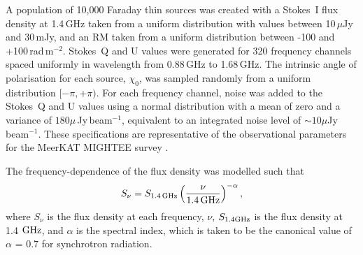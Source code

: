 \documentclass[fleqn,usenatbib]{mnras}
\begin{document}

A population of 10,000 Faraday thin sources was created with a Stokes~I flux density at 1.4\,GHz taken from a uniform distribution with values between 10\,$\mu$Jy and  30\,mJy, and an RM taken from a uniform distribution between -100 and +100\,rad\,m$^{-2}$. Stokes~Q and U values were generated for 320 frequency channels spaced uniformly in wavelength from 0.88\,GHz to 1.68\,GHz. The intrinsic angle of polarisation for each source, $\chi_0$, was sampled randomly from a uniform distribution $[-\pi, +\pi)$.
For each frequency channel, noise was added to the Stokes~Q and U values using a normal distribution with a mean of zero and a variance of $180\mu$\,Jy\,beam$^{-1}$, equivalent to an integrated noise level of $\sim 10\mu$Jy\,beam$^{-1}$. These specifications are representative of the observational parameters for the MeerKAT MIGHTEE survey \citep{Taylor_2017}.


The frequency-dependence of the flux density was modelled such that
%
\begin{equation}
\label{FreqDependent}
S_{\nu} = S_{\rm 1.4\,GHz}\left(\frac{\nu}{\rm 1.4\,GHz} \right)^{-\alpha},
\end{equation}
%
where $S_\nu$ is the flux density at each frequency, $\nu$, $S_{1.4\rm{GHz}}$ is the flux density at 1.4 $\rm{GHz}$, and $\alpha$ is the spectral index, which is taken to be the canonical value of $\alpha$ = 0.7 for synchrotron radiation.
\end{document}
